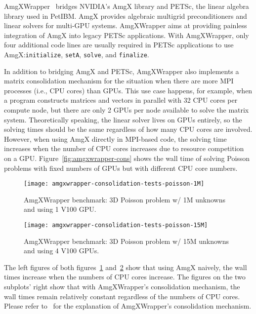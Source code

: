 

AmgXWrapper~\cite{chuang_amgxwrapper:_2017} bridges NVIDIA's AmgX library and PETSc, the linear algebra library used in PetIBM\@.
AmgX provides algebraic multigrid preconditioners and linear solvers for multi-GPU systems.
AmgXWrapper aims at providing painless integration of AmgX into legacy PETSc applications.
With AmgXWrapper, only four additional code lines are usually required in PETSc applications to use AmgX:\@ \lstinline{initialize}, \lstinline{setA}, \lstinline{solve}, and \lstinline{finalize}.

In addition to bridging AmgX and PETSc, AmgXWrapper also implements a matrix consolidation mechanism for the situation when there are more MPI processes (i.e., CPU cores) than GPUs.
This use case happens, for example, when a program constructs matrices and vectors in parallel with 32 CPU cores per compute node, but there are only 2 GPUs per node available to solve the matrix system.
Theoretically speaking, the linear solver lives on GPUs entirely, so the solving times should be the same regardless of how many CPU cores are involved.
However, when using AmgX directly in MPI-based code, the solving time increases when the number of CPU cores increases due to resource competition on a GPU\@.
Figure~\ref{fig:amgxwrapper-cons} shows the wall time of solving Poisson problems with fixed numbers of GPUs but with different CPU core numbers.

\begin{figure}[hbt!]%
    \texttt{[image: amgxwrapper-consolidation-tests-poisson-1M]}%
    \caption{AmgXWrapper benchmark: 3D Poisson problem w/ 1M unknowns and using 1 V100 GPU.}\label{fig:amgxwrapper-cons-1M}%
\end{figure}
\begin{figure}[hbt!]%
    \texttt{[image: amgxwrapper-consolidation-tests-poisson-15M]}%
    \caption{AmgXWrapper benchmark: 3D Poisson problem w/ 15M unknowns and using 4 V100 GPUs.}\label{fig:amgxwrapper-cons-15M}%
\end{figure}

The left figures of both figures~\ref{fig:amgxwrapper-cons-1M} and~\ref{fig:amgxwrapper-cons-15M} show that using AmgX naively, the wall times increase when the numbers of CPU cores increase. 
The figures on the two subplots' right show that with AmgXWrapper's consolidation mechanism, the wall times remain relatively constant regardless of the numbers of CPU cores.
Please refer to~\cite{chuang_amgxwrapper:_2017} for the explanation of AmgXWrapper's consolidation mechanism.

